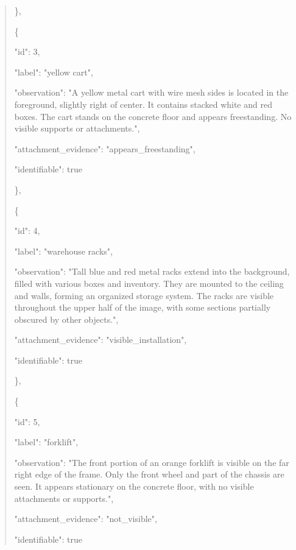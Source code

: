 \documentclass[10pt,a4paper]{article}
\begin{document}
\begin{quote}
    \},\allowbreak{}\par
    \{\par
      "id":\allowbreak{} 3,\allowbreak{}\par
      "label":\allowbreak{} "yellow cart",\allowbreak{}\par
      "observation":\allowbreak{} "A yellow metal cart with wire mesh sides is located in the foreground,\allowbreak{} slightly right of center. It contains stacked white and red boxes. The cart stands on the concrete floor and appears freestanding. No visible supports or attachments.",\allowbreak{}\par
      "attachment\_evidence":\allowbreak{} "appears\_freestanding",\allowbreak{}\par
      "identifiable":\allowbreak{} true\par
    \},\allowbreak{}\par
    \{\par
      "id":\allowbreak{} 4,\allowbreak{}\par
      "label":\allowbreak{} "warehouse racks",\allowbreak{}\par
      "observation":\allowbreak{} "Tall blue and red metal racks extend into the background,\allowbreak{} filled with various boxes and inventory. They are mounted to the ceiling and walls,\allowbreak{} forming an organized storage system. The racks are visible throughout the upper half of the image,\allowbreak{} with some sections partially obscured by other objects.",\allowbreak{}\par
      "attachment\_evidence":\allowbreak{} "visible\_installation",\allowbreak{}\par
      "identifiable":\allowbreak{} true\par
    \},\allowbreak{}\par
    \{\par
      "id":\allowbreak{} 5,\allowbreak{}\par
      "label":\allowbreak{} "forklift",\allowbreak{}\par
      "observation":\allowbreak{} "The front portion of an orange forklift is visible on the far right edge of the frame. Only the front wheel and part of the chassis are seen. It appears stationary on the concrete floor,\allowbreak{} with no visible attachments or supports.",\allowbreak{}\par
      "attachment\_evidence":\allowbreak{} "not\_visible",\allowbreak{}\par
      "identifiable":\allowbreak{} true\par

\end{quote}
\end{document}
